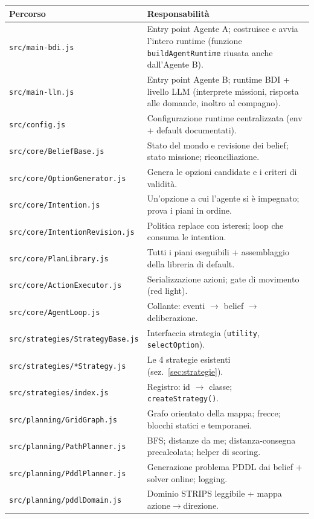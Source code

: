 \documentclass[11pt,a4paper]{article}
\newcommand{\file}[1]{\texttt{#1}}
\newcommand{\code}[1]{\texttt{#1}}
\begin{document}
\begin{longtable}{@{}p{}p{}@{}}
\toprule
\textbf{Percorso} & \textbf{Responsabilità} \\
\midrule
\file{src/main-bdi.js} & Entry point Agente A; costruisce e avvia l'intero runtime (funzione \code{buildAgentRuntime} riusata anche dall'Agente B). \\
\file{src/main-llm.js} & Entry point Agente B; runtime BDI + livello LLM (interprete missioni, risposta alle domande, inoltro al compagno). \\
\file{src/config.js} & Configurazione runtime centralizzata (env + default documentati). \\
\midrule
\file{src/core/BeliefBase.js} & Stato del mondo e revisione dei belief; stato missione; riconciliazione. \\
\file{src/core/OptionGenerator.js} & Genera le opzioni candidate e i criteri di validità. \\
\file{src/core/Intention.js} & Un'opzione a cui l'agente si è impegnato; prova i piani in ordine. \\
\file{src/core/IntentionRevision.js} & Politica replace con isteresi; loop che consuma le intention. \\
\file{src/core/PlanLibrary.js} & Tutti i piani eseguibili + assemblaggio della libreria di default. \\
\file{src/core/ActionExecutor.js} & Serializzazione azioni; gate di movimento (red light). \\
\file{src/core/AgentLoop.js} & Collante: eventi $\rightarrow$ belief $\rightarrow$ deliberazione. \\
\midrule
\file{src/strategies/StrategyBase.js} & Interfaccia strategia (\code{utility}, \code{selectOption}). \\
\file{src/strategies/*Strategy.js} & Le 4 strategie esistenti (sez.~\ref{sec:strategie}). \\
\file{src/strategies/index.js} & Registro: id $\rightarrow$ classe; \code{createStrategy()}. \\
\midrule
\file{src/planning/GridGraph.js} & Grafo orientato della mappa; frecce; blocchi statici e temporanei. \\
\file{src/planning/PathPlanner.js} & BFS; distanze da me; distanza-consegna precalcolata; helper di scoring. \\
\file{src/planning/PddlPlanner.js} & Generazione problema PDDL dai belief + solver online; logging. \\
\file{src/planning/pddlDomain.js} & Dominio STRIPS leggibile + mappa azione$\rightarrow$direzione. \\

\end{longtable}
\end{document}
